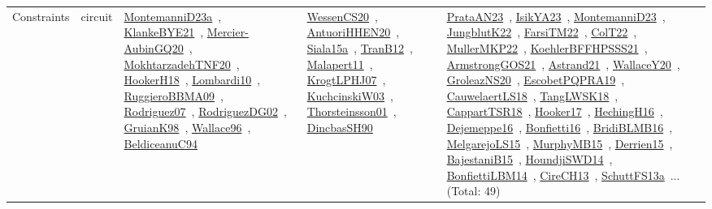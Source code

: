 {\begin{longtable}{lp{3cm}>{\raggedright\arraybackslash}p{6cm}>{\raggedright\arraybackslash}p{6cm}>{\raggedright\arraybackslash}p{8cm}}
Constraints & circuit & \href{works/MontemanniD23a.pdf}{MontemanniD23a}~\cite{MontemanniD23a}, \href{works/KlankeBYE21.pdf}{KlankeBYE21}~\cite{KlankeBYE21}, \href{works/Mercier-AubinGQ20.pdf}{Mercier-AubinGQ20}~\cite{Mercier-AubinGQ20}, \href{works/MokhtarzadehTNF20.pdf}{MokhtarzadehTNF20}~\cite{MokhtarzadehTNF20}, \href{works/HookerH18.pdf}{HookerH18}~\cite{HookerH18}, \href{works/Lombardi10.pdf}{Lombardi10}~\cite{Lombardi10}, \href{works/RuggieroBBMA09.pdf}{RuggieroBBMA09}~\cite{RuggieroBBMA09}, \href{works/Rodriguez07.pdf}{Rodriguez07}~\cite{Rodriguez07}, \href{works/RodriguezDG02.pdf}{RodriguezDG02}~\cite{RodriguezDG02}, \href{works/GruianK98.pdf}{GruianK98}~\cite{GruianK98}, \href{works/Wallace96.pdf}{Wallace96}~\cite{Wallace96}, \href{works/BeldiceanuC94.pdf}{BeldiceanuC94}~\cite{BeldiceanuC94} & \href{works/WessenCS20.pdf}{WessenCS20}~\cite{WessenCS20}, \href{works/AntuoriHHEN20.pdf}{AntuoriHHEN20}~\cite{AntuoriHHEN20}, \href{works/Siala15a.pdf}{Siala15a}~\cite{Siala15a}, \href{works/TranB12.pdf}{TranB12}~\cite{TranB12}, \href{works/Malapert11.pdf}{Malapert11}~\cite{Malapert11}, \href{works/KrogtLPHJ07.pdf}{KrogtLPHJ07}~\cite{KrogtLPHJ07}, \href{works/KuchcinskiW03.pdf}{KuchcinskiW03}~\cite{KuchcinskiW03}, \href{works/Thorsteinsson01.pdf}{Thorsteinsson01}~\cite{Thorsteinsson01}, \href{works/DincbasSH90.pdf}{DincbasSH90}~\cite{DincbasSH90} & \href{works/PrataAN23.pdf}{PrataAN23}~\cite{PrataAN23}, \href{works/IsikYA23.pdf}{IsikYA23}~\cite{IsikYA23}, \href{works/MontemanniD23.pdf}{MontemanniD23}~\cite{MontemanniD23}, \href{works/JungblutK22.pdf}{JungblutK22}~\cite{JungblutK22}, \href{works/FarsiTM22.pdf}{FarsiTM22}~\cite{FarsiTM22}, \href{works/ColT22.pdf}{ColT22}~\cite{ColT22}, \href{works/MullerMKP22.pdf}{MullerMKP22}~\cite{MullerMKP22}, \href{works/KoehlerBFFHPSSS21.pdf}{KoehlerBFFHPSSS21}~\cite{KoehlerBFFHPSSS21}, \href{works/ArmstrongGOS21.pdf}{ArmstrongGOS21}~\cite{ArmstrongGOS21}, \href{works/Astrand21.pdf}{Astrand21}~\cite{Astrand21}, \href{works/WallaceY20.pdf}{WallaceY20}~\cite{WallaceY20}, \href{works/GroleazNS20.pdf}{GroleazNS20}~\cite{GroleazNS20}, \href{works/EscobetPQPRA19.pdf}{EscobetPQPRA19}~\cite{EscobetPQPRA19}, \href{works/CauwelaertLS18.pdf}{CauwelaertLS18}~\cite{CauwelaertLS18}, \href{works/TangLWSK18.pdf}{TangLWSK18}~\cite{TangLWSK18}, \href{works/CappartTSR18.pdf}{CappartTSR18}~\cite{CappartTSR18}, \href{works/Hooker17.pdf}{Hooker17}~\cite{Hooker17}, \href{works/HechingH16.pdf}{HechingH16}~\cite{HechingH16}, \href{works/Dejemeppe16.pdf}{Dejemeppe16}~\cite{Dejemeppe16}, \href{works/Bonfietti16.pdf}{Bonfietti16}~\cite{Bonfietti16}, \href{works/BridiBLMB16.pdf}{BridiBLMB16}~\cite{BridiBLMB16}, \href{works/MelgarejoLS15.pdf}{MelgarejoLS15}~\cite{MelgarejoLS15}, \href{works/MurphyMB15.pdf}{MurphyMB15}~\cite{MurphyMB15}, \href{works/Derrien15.pdf}{Derrien15}~\cite{Derrien15}, \href{works/BajestaniB15.pdf}{BajestaniB15}~\cite{BajestaniB15}, \href{works/HoundjiSWD14.pdf}{HoundjiSWD14}~\cite{HoundjiSWD14}, \href{works/BonfiettiLBM14.pdf}{BonfiettiLBM14}~\cite{BonfiettiLBM14}, \href{works/CireCH13.pdf}{CireCH13}~\cite{CireCH13}, \href{works/SchuttFS13a.pdf}{SchuttFS13a}~\cite{SchuttFS13a}... (Total: 49)\\

\end{longtable}}
